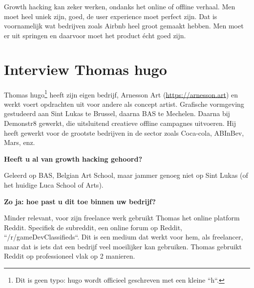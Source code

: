 Growth hacking kan zeker werken, ondanks het online of offline verhaal. Men moet heel uniek zijn, goed, de user experience moet perfect zijn. Dat is voornamelijk wat bedrijven zoals Airbnb heel groot gemaakt hebben. Men moet er uit springen en daarvoor moet het product écht goed zijn.

\section{Interview Thomas hugo}
\label{sec:interview-thomas-hugo}

Thomas hugo\footnote{Dit is geen typo: hugo wordt officieel geschreven met een kleine ``h``. } heeft zijn eigen bedrijf, Arnesson Art (\href{https://arnesson.art/}{https://arnesson.art}) en werkt voert opdrachten uit voor andere als concept artist. Grafische vormgeving gestudeerd aan Sint Lukas te Brussel, daarna BAS te Mechelen. Daarna bij Demonstr8 gewerkt, die uitsluitend creatieve offline campagnes uitvoeren. Hij heeft gewerkt voor de grootste bedrijven in de sector zoals Coca-cola, ABInBev, Mars, enz.

\textbf{Heeft u al van growth hacking gehoord?}
	
Geleerd op BAS, Belgian Art School, maar jammer genoeg niet op Sint Lukas (of het huidige Luca School of Arts). 
	
\textbf{Zo ja: hoe past u dit toe binnen uw bedrijf?}
	
Minder relevant, voor zijn freelance werk gebruikt Thomas het online platform Reddit. Specifiek de subreddit, een online forum op Reddit, ``/r/gameDevClassifieds``. Dit is een medium dat werkt voor hem, als freelancer, maar dat is iets dat een bedrijf veel moeilijker kan gebruiken. Thomas gebruikt Reddit op professioneel vlak op 2 manieren. 
	
